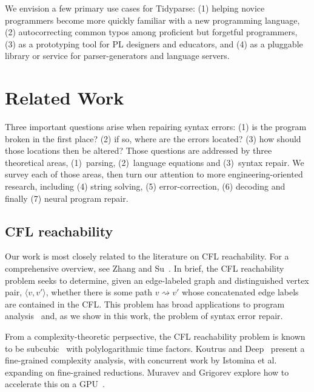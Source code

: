 \documentclass[sigplan,review,acmsmall,nonacm,screen,anonymous]{acmart}\settopmatter{printfolios=false,printccs=false,printacmref=false}
\begin{document}
We envision a few primary use cases for Tidyparse: (1) helping novice programmers become more quickly familiar with a new programming language, (2) autocorrecting common typos among proficient but forgetful programmers, (3) as a prototyping tool for PL designers and educators, and (4) as a pluggable library or service for parser-generators and language servers.

\clearpage\section{Related Work}\label{sec:related}

Three important questions arise when repairing syntax errors: (1) is the program broken in the first place? (2) if so, where are the errors located? (3) how should those locations then be altered? Those questions are addressed by three theoretical areas, (1)~parsing, (2)~language equations and (3)~syntax repair. We survey each of those areas, then turn our attention to more engineering-oriented research, including (4) string solving, (5) error-correction, (6) decoding and finally (7) neural program repair.

\subsection{CFL reachability}

Our work is most closely related to the literature on CFL reachability. For a comprehensive overview, see Zhang and Su~\cite{zhang2017context}. In brief, the CFL reachability problem seeks to determine, given an edge-labeled graph and distinguished vertex pair, $\langle v, v' \rangle$, whether there is some path $v \rightsquigarrow v'$ whose concatenated edge labels are contained in the CFL. This problem has broad applications to program analysis~\cite{kodumal2004set, reps1998program} and, as we show in this work, the problem of syntax error repair.

From a complexity-theoretic perpsective, the CFL reachability problem is known to be subcubic~\cite{chistikov2022subcubic} with polylogarithmic time factors. Koutrus and Deep~\cite{koutris2023fine} present a fine-grained complexity analysis, with concurrent work by Istomina et al.~\cite{istomina2023fine} expanding on fine-grained reductions. Muravev and Grigorev explore how to accelerate this on a GPU~\cite{muravev2025universal}.
\end{document}
